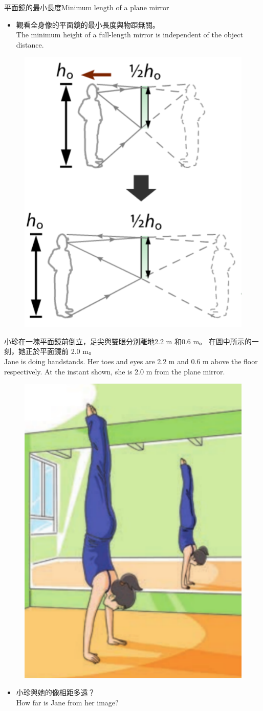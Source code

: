 \documentclass[beamer=true]{standalone}
\begin{document}
\begin{frame}{平面鏡的最小長度Minimum length of a plane mirror}
\begin{itemize}
    \item 觀看全身像的平面鏡的最小長度與物距無關。\\The minimum height of a full-length mirror is independent of the object distance.
\end{itemize}

\begin{figure}
    \centering
    \includegraphics[width=0.4\linewidth]{assets/dwqdqop1i2m9d.png}
\end{figure}
\end{frame}

\begin{eg}
    小珍在一塊平面鏡前倒立，足尖與雙眼分別離地2.2 m 和0.6 m。 在圖中所示的一刻，她正於平面鏡前 2.0 m。\\Jane is doing handstands. Her toes and eyes are 2.2 m and 0.6 m above the floor respectively. At the instant shown, she is 2.0 m from the plane mirror.
    \begin{figure}
        \centering
        \includegraphics[width=0.25\linewidth]{assets/dwqdqwdqwd1dd3md9.png}
        
        
    \end{figure}
\end{eg}
\begin{eg}
    \begin{itemize}
        \item [(a)] 小珍與她的像相距多遠？\\How far is Jane from her image?
    \end{itemize}
\end{eg}
\end{document}
